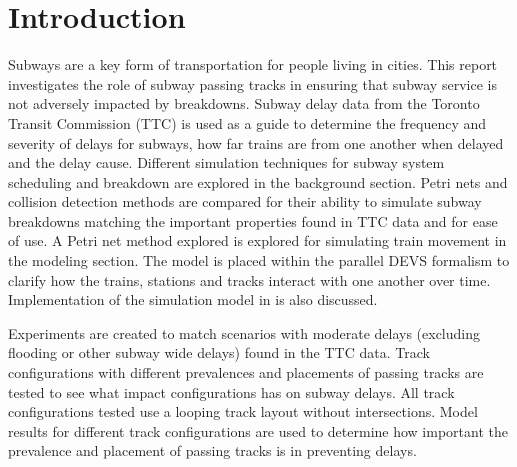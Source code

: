 \section{Introduction}

Subways are a key form of transportation for people living in cities. This
report investigates the role of subway passing tracks in ensuring that subway
service is not adversely impacted by breakdowns. Subway delay data from the Toronto Transit Commission (TTC) is used as a guide to determine the frequency and severity of delays for subways, how far trains are from one another when delayed and the delay cause. Different simulation techniques for subway system scheduling and breakdown are
explored in the background section. Petri nets and collision detection methods
are compared for their ability to simulate subway breakdowns matching the
important properties found in TTC data and for ease of use. A Petri net method explored is explored for simulating train movement in the modeling section. The model is placed within the parallel DEVS formalism to clarify how the trains, stations and tracks interact with one another over time. Implementation of the simulation model in  is also discussed.

Experiments are created to match scenarios with moderate delays (excluding
flooding or other subway wide delays) found in the TTC data. Track
configurations with different prevalences and placements of passing tracks are
tested to see what impact configurations has on subway delays. All track
configurations tested use a looping track layout without intersections. Model results for different track configurations are used to determine how
important the prevalence and placement of passing tracks is in preventing
delays. 